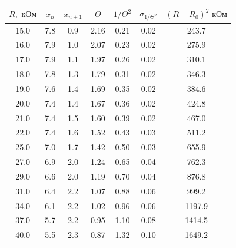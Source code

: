\documentclass[a4paper, 12pt]{article}
\begin{document}
\begin{table}[H]
\centering
\begin{tabular}{|c|c|c|c|c|c|c|}
\hline
$R, \text{ кОм}$ & $x_n$ & $x_{n+1}$ & $\Theta$ & $1/\Theta^2$ & $\sigma_{1/\Theta^2}$ & $(R+R_0)^2 \text{ кОм}$ \\ \hline
15.0             & 7.8   & 0.9       & 2.16     & 0.21         & 0.02                  & 243.7                   \\ \hline
16.0             & 7.9   & 1.0       & 2.07     & 0.23         & 0.02                  & 275.9                   \\ \hline
17.0             & 7.9   & 1.1       & 1.97     & 0.26         & 0.02                  & 310.1                   \\ \hline
18.0             & 7.8   & 1.3       & 1.79     & 0.31         & 0.02                  & 346.3                   \\ \hline
19.0             & 7.6   & 1.4       & 1.69     & 0.35         & 0.02                  & 384.6                   \\ \hline
20.0             & 7.4   & 1.4       & 1.67     & 0.36         & 0.02                  & 424.8                   \\ \hline
21.0             & 7.4   & 1.5       & 1.60     & 0.39         & 0.02                  & 467.0                   \\ \hline
22.0             & 7.4   & 1.6       & 1.52     & 0.43         & 0.03                  & 511.2                   \\ \hline
25.0             & 7.0   & 1.7       & 1.42     & 0.50         & 0.03                  & 655.9                   \\ \hline
27.0             & 6.9   & 2.0       & 1.24     & 0.65         & 0.04                  & 762.3                   \\ \hline
29.0             & 6.6   & 2.0       & 1.19     & 0.70         & 0.04                  & 876.8                   \\ \hline
31.0             & 6.4   & 2.2       & 1.07     & 0.88         & 0.06                  & 999.2                   \\ \hline
34.0             & 6.1   & 2.2       & 1.02     & 0.96         & 0.06                  & 1197.9                  \\ \hline
37.0             & 5.7   & 2.2       & 0.95     & 1.10         & 0.08                  & 1414.5                  \\ \hline
40.0             & 5.5   & 2.3       & 0.87     & 1.32         & 0.10                  & 1649.2                  \\ \hline

\end{tabular}
\end{table}
\end{document}

